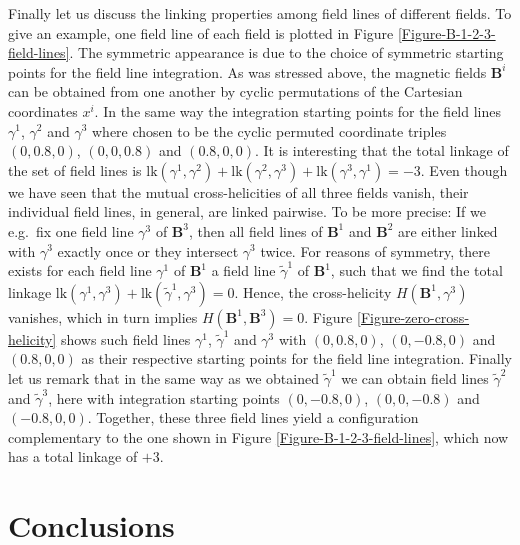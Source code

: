 \documentclass[10pt]{iopart}
\def \text{\mbox}
\def \bB{{\mathbf{B}}}
\begin{document}
Finally let us discuss the linking properties among field lines of
different fields.
To give an example,
one field line of each field is plotted in
Figure \ref{Figure-B-1-2-3-field-lines}.
The symmetric appearance is
due to the choice of symmetric starting points for the field line
integration.
As was stressed above, the magnetic fields $\bB^i$ can be obtained
from one another by cyclic permutations of the
Cartesian coordinates $x^i$. In the same way the integration starting
points for the field lines $\gamma^1$, $\gamma^2$ and $\gamma^3$ where
chosen to be the cyclic permuted coordinate triples
$(0, 0.8, 0)$,  $(0, 0, 0.8)$ and  $(0.8, 0, 0)$.
It is interesting that the total linkage of the set of field lines is
$\text{lk}(\gamma^1,\gamma^2)+
 \text{lk}(\gamma^2,\gamma^3)+
 \text{lk}(\gamma^3,\gamma^1)=-3$.
Even though we have seen that the mutual
cross-helicities of all three fields vanish, their individual field lines,
in general, are linked pairwise.
To be more precise:
If we e.g.~fix one field line $\gamma^3$ of $\bB^3$, then all
field lines of $\bB^1$ and $\bB^2$ are either linked with
$\gamma^3$ exactly once or they intersect $\gamma^3$ twice.
For reasons of symmetry, there exists for each field line $\gamma^1$
of $\bB^1$ a field line $\tilde{\gamma}^1$ of $\bB^1$,
such that we find the total linkage 
$\text{lk}(\gamma^1,\gamma^3) + \text{lk}(\tilde{\gamma}^1,\gamma^3)=0$.
Hence, the cross-helicity $H(\bB^1,\gamma^3)$ vanishes, which in turn
implies $H(\bB^1, \bB^3)=0$. Figure \ref{Figure-zero-cross-helicity}
shows such field lines
$\gamma^1$, $\tilde{\gamma}^1$ and $\gamma^3$
with $(0, 0.8, 0)$,  $(0, -0.8, 0)$ and  $(0.8, 0, 0)$ as their
respective starting points for the field line integration.
Finally let us remark that in the same way as we obtained
$\tilde{\gamma}^1$ we can obtain field lines
$\tilde{\gamma}^2$ and $\tilde{\gamma}^3$,
here with integration starting points
$(0, -0.8, 0)$,  $(0, 0, -0.8)$ and  $(-0.8, 0, 0)$.
Together, these three field lines
yield a configuration complementary to the one shown in
Figure \ref{Figure-B-1-2-3-field-lines},
which now has a total linkage of $+3$.


\section{Conclusions}
\end{document}
